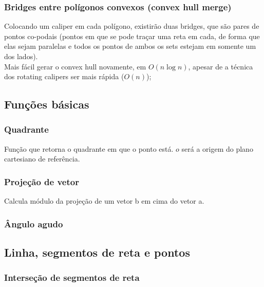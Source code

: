 \subsubsection{Bridges entre pol\'{i}gonos convexos (convex hull merge)}
Colocando um caliper em cada pol\'{i}gono, existir\~{a}o duas bridges, que s\~{a}o pares de pontos co-podais (pontos em que se pode tra\c{c}ar uma reta em cada, de forma que elas sejam paralelas e todos os pontos de ambos os sets estejam em somente um dos lados).
\\ Mais f\'{a}cil gerar o convex hull novamente, em $O(n \log{n})$, apesar de a t\'{e}cnica dos rotating calipers ser mais r\'{a}pida ($O(n)$);
\divisor


\subsection{Fun\c{c}\~{o}es b\'{a}sicas}
\subsubsection{Quadrante}
Fun\c{c}\~{a}o que retorna o quadrante em que o ponto est\'{a}. $o$ ser\'{a} a origem do plano cartesiano de refer\^{e}ncia.
\divisor

\subsubsection{Proje\c{c}\~{a}o de vetor}
Calcula m\'{o}dulo da proje\c{c}\~{a}o de um vetor b em cima do vetor a.
\divisor

\subsubsection{\^{A}ngulo agudo}


\subsection{Linha, segmentos de reta e pontos}

\subsubsection{Interse\c{c}\~{a}o de segmentos de reta}
\divisor

